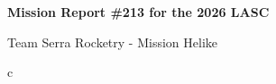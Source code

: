 \documentclass[10pt]{article}
\author{}
\date{}
\newcommand{\ReportTitle}[1]{%
  \begin{center}
    {\fontsize{18}{28}\selectfont\bfseries #1}
  \end{center}
}
\newcommand{\ReportSubtitle}[1]{%
  \begin{center}
    {\fontsize{16}{18}\selectfont #1}
  \end{center}
}
\begin{document}
\ReportTitle{Mission Report \#213 for the 2026 LASC}
\vspace{-0.5cm} %
\ReportSubtitle{Team Serra Rocketry - Mission Helike}



\clearpage
\setcounter{subsection}{0}
\clearpage
\setcounter{subsection}{0}c
\clearpage
\setcounter{subsection}{0}
\end{document}
